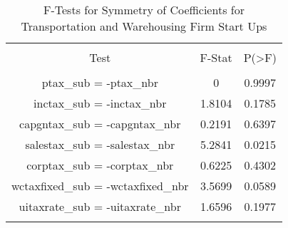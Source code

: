 
\begin{table}[!htbp] \centering 
  \caption{F-Tests for Symmetry of Coefficients for Transportation and Warehousing Firm Start Ups} 
  \label{48-49Ftests} 
\begin{tabular}{@{\extracolsep{5pt}} ccc} 
\\[-1.8ex]\hline 
\hline \\[-1.8ex] 
Test & F-Stat & P(\textgreater F) \\ 
\hline \\[-1.8ex] 
ptax\_sub = -ptax\_nbr & 0 & 0.9997 \\ 
inctax\_sub = -inctax\_nbr & 1.8104 & 0.1785 \\ 
capgntax\_sub = -capgntax\_nbr & 0.2191 & 0.6397 \\ 
salestax\_sub = -salestax\_nbr & 5.2841 & 0.0215 \\ 
corptax\_sub = -corptax\_nbr & 0.6225 & 0.4302 \\ 
wctaxfixed\_sub = -wctaxfixed\_nbr & 3.5699 & 0.0589 \\ 
uitaxrate\_sub = -uitaxrate\_nbr & 1.6596 & 0.1977 \\ 
\hline \\[-1.8ex] 
\end{tabular} 
\end{table} 
